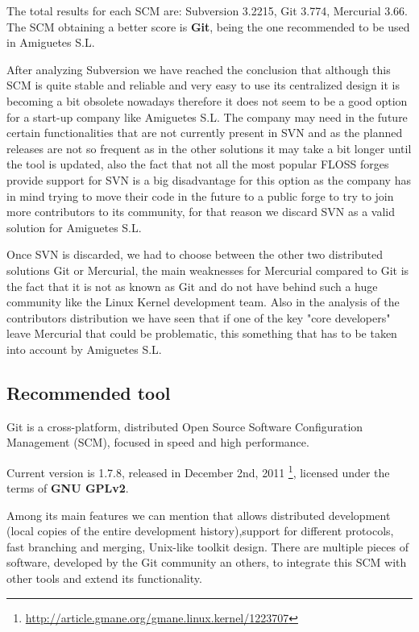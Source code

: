 \documentclass[a4paper,10pt]{article}
\begin{document}
The total results for each SCM are: Subversion 3.2215, Git 3.774, Mercurial
3.66. The SCM obtaining a better score is \textbf{Git}, being the one
recommended to be used in Amiguetes S.L.

After analyzing Subversion we have reached the conclusion that although this SCM
is quite stable and reliable and very easy to use its centralized design it is
becoming a bit obsolete nowadays therefore it does not seem to be a good option
for a start-up company like Amiguetes S.L. The company may need in the future
certain functionalities that are not currently present in SVN and as the planned
releases are not so frequent as in the other solutions it may take a bit longer
until the tool is updated, also the fact that not all the most popular FLOSS
forges provide support for SVN is a big disadvantage for this option as the
company has in mind trying to move their code in the future to a public forge to
try to join more contributors to its community, for that reason we discard SVN
as a valid solution for Amiguetes S.L.

Once SVN is discarded, we had to choose between the other two distributed solutions Git or Mercurial, the main weaknesses for Mercurial compared to Git is the fact that it is not as known as Git and do not have behind such a huge community like the Linux Kernel development team. Also in the analysis of the contributors distribution we have seen that if one of the key "core developers" leave Mercurial that could be problematic, this something that has to be taken into account by Amiguetes S.L.

\subsection{Recommended tool}

Git\cite{Git} is a cross-platform, distributed Open Source Software
Configuration Management (SCM), focused in speed and high performance.

Current version is 1.7.8, released in December 2nd, 2011
\footnote{\url{http://article.gmane.org/gmane.linux.kernel/1223707}}, licensed
under the terms of \textbf{GNU GPLv2}.

Among its main features we can mention that allows distributed development
(local copies of the entire development history),support for different
protocols, fast branching and merging, Unix-like toolkit design. There are
multiple pieces of software, developed by the Git community an others, to
integrate this SCM with other tools and extend its functionality.
\end{document}

